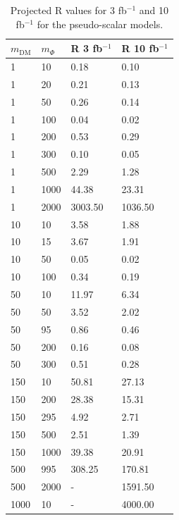 \begin{table}[h!]
  \centering
  \begin{tabular}{llll}
    \hline                      
    $m_\textrm{DM}$ & $m_\Phi$  & R 3 fb$^{-1}$ & R 10 fb$^{-1}$ \\ \hline
    1       & 10      & 0.18    & 0.10 \\ \hline
    1       & 20      & 0.21    & 0.13 \\ \hline
    1       & 50      & 0.26    & 0.14 \\ \hline
    1       & 100     & 0.04    & 0.02 \\ \hline
    1       & 200     & 0.53    & 0.29 \\ \hline
    1       & 300     & 0.10    & 0.05 \\ \hline
    1       & 500     & 2.29    & 1.28 \\ \hline
    1       & 1000    & 44.38   & 23.31 \\ \hline
    1       & 2000    & 3003.50 & 1036.50 \\ \hline
    10      & 10      & 3.58    & 1.88 \\ \hline
    10      & 15      & 3.67    & 1.91 \\ \hline
    10      & 50      & 0.05    & 0.02 \\ \hline
    10      & 100     & 0.34    & 0.19 \\ \hline
    50      & 10      & 11.97   & 6.34 \\ \hline
    50      & 50      & 3.52    & 2.02 \\ \hline
    50      & 95      & 0.86    & 0.46 \\ \hline
    50      & 200     & 0.16    & 0.08 \\ \hline
    50      & 300     & 0.51    & 0.28 \\ \hline
    150     & 10      & 50.81   & 27.13 \\ \hline
    150     & 200     & 28.38   & 15.31 \\ \hline
    150     & 295     & 4.92    & 2.71 \\ \hline
    150     & 500     & 2.51    & 1.39 \\ \hline
    150     & 1000    & 39.38   & 20.91 \\ \hline
    500     & 995     & 308.25  & 170.81 \\ \hline
    500     & 2000    & -       & 1591.50 \\ \hline
    1000    & 10      & -       & 4000.00 \\ \hline
  \end{tabular}
  \caption{Projected R values for 3 fb$^{-1}$ and 10 fb$^{-1}$ for the pseudo-scalar models. \label{tab:dm_P_R_values}}
\end{table}



